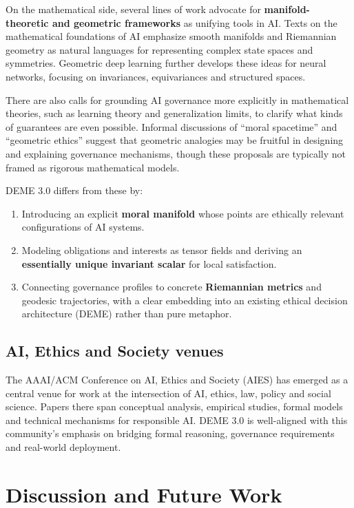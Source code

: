 \documentclass[12pt]{article}
\theoremstyle{remark}
\begin{document}
On the mathematical side, several lines of work advocate for \textbf{manifold-theoretic and geometric frameworks} as unifying tools in AI. Texts on the mathematical foundations of AI emphasize smooth manifolds and Riemannian geometry as natural languages for representing complex state spaces and symmetries. Geometric deep learning further develops these ideas for neural networks, focusing on invariances, equivariances and structured spaces.

There are also calls for grounding AI governance more explicitly in mathematical theories, such as learning theory and generalization limits, to clarify what kinds of guarantees are even possible. Informal discussions of ``moral spacetime'' and ``geometric ethics'' suggest that geometric analogies may be fruitful in designing and explaining governance mechanisms, though these proposals are typically not framed as rigorous mathematical models.

DEME 3.0 differs from these by:

\begin{enumerate}
    \item Introducing an explicit \textbf{moral manifold} whose points are ethically relevant configurations of AI systems.
    \item Modeling obligations and interests as tensor fields and deriving an \textbf{essentially unique invariant scalar} for local satisfaction.
    \item Connecting governance profiles to concrete \textbf{Riemannian metrics} and geodesic trajectories, with a clear embedding into an existing ethical decision architecture (DEME) rather than pure metaphor.
\end{enumerate}

\subsection{AI, Ethics and Society venues}

The AAAI/ACM Conference on AI, Ethics and Society (AIES) has emerged as a central venue for work at the intersection of AI, ethics, law, policy and social science. Papers there span conceptual analysis, empirical studies, formal models and technical mechanisms for responsible AI. DEME 3.0 is well-aligned with this community's emphasis on bridging formal reasoning, governance requirements and real-world deployment.

\section{Discussion and Future Work}
\end{document}
